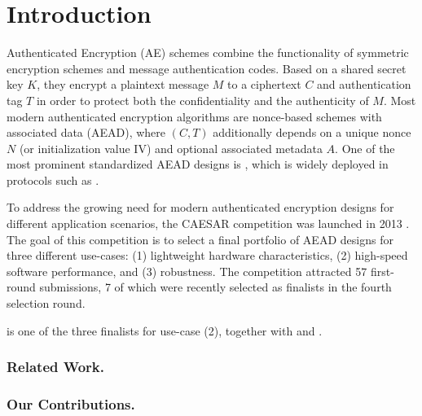 \section{Introduction}
\label{sec/Introduction}

Authenticated Encryption (AE) schemes combine the functionality of symmetric encryption schemes and message authentication codes.
Based on a shared secret key $K$, they encrypt a plaintext message $M$ to a ciphertext $C$ and authentication tag $T$ in order to protect both the confidentiality and the authenticity of $M$.
Most modern authenticated encryption algorithms are nonce-based schemes with associated data (AEAD),
where $(C, T)$ additionally depends on a unique nonce $N$ (or initialization value IV) and optional associated metadata $A$.
One of the most prominent standardized AEAD designs is  \cite{TODOMV05,TODONIST},
which is widely deployed in protocols such as .

To address the growing need for modern authenticated encryption designs for different application scenarios, 
the CAESAR competition was launched in 2013 \cite{CAESAR}.
The goal of this competition is to select a final portfolio of AEAD designs for three different use-cases:
(1) lightweight hardware characteristics,
(2) high-speed software performance, and
(3) robustness.
The competition attracted 57 first-round submissions, 7 of which were recently selected as finalists in the fourth selection round.

\morus is one of the three finalists for use-case (2), together with  and .

\subsubsection*{Related Work.}



\subsubsection*{Our Contributions.}

